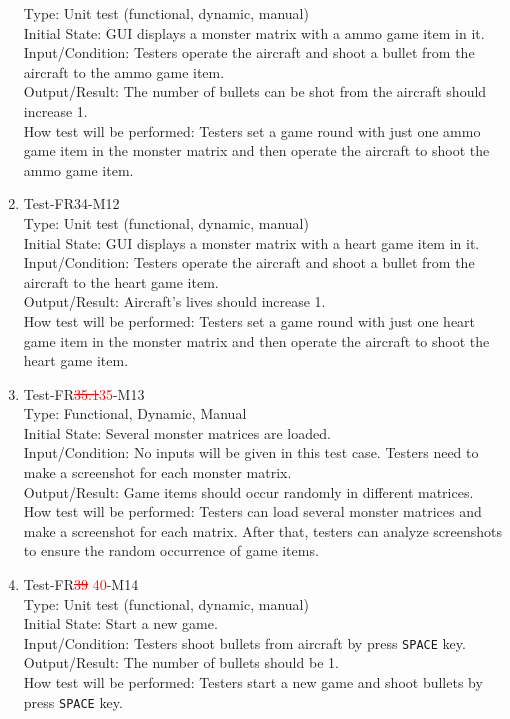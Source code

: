 \documentclass[12pt]{article}
\begin{document}
\begin{enumerate}[1.]
Type: Unit test (functional, dynamic, manual)\\
Initial State: GUI displays a monster matrix with a ammo
game item in it.\\
Input/Condition: Testers operate the aircraft and shoot a bullet
from the aircraft to the ammo game item.\\
Output/Result: The number of bullets can be shot from the 
aircraft should increase 1.\\
How test will be performed: Testers set a game round
with just one ammo game item in the monster matrix and then operate
the aircraft to shoot the ammo game item.
\item Test-FR34-M12\\
Type: Unit test (functional, dynamic, manual)\\
Initial State: GUI displays a monster matrix with a heart
game item in it.\\
Input/Condition:  Testers operate the aircraft and shoot a bullet
from the aircraft to the heart game item.\\
Output/Result: Aircraft's lives should increase 1.\\
How test will be performed:  Testers set a game round
with just one heart game item in the monster matrix and then operate
the aircraft to shoot the heart game item.
\item Test-FR\textcolor{red}{\st{35.1}35}-M13\\
Type: Functional, Dynamic, Manual\\
Initial State: Several monster matrices are loaded.\\ 
Input/Condition: No inputs will be given in this test case. Testers
need to make a screenshot for
each monster matrix.\\
Output/Result: Game items should occur randomly in 
different matrices.\\
How test will be performed: Testers can load several 
monster matrices and make a screenshot for each matrix.
After that, testers can analyze screenshots to ensure
the random occurrence of game items.
\newpage
\item Test-FR\textcolor{red}{\st{39} 40}-M14\\
Type: Unit test (functional, dynamic, manual)\\
Initial State: Start a new game.\\
Input/Condition: Testers shoot bullets from 
aircraft by press \verb|SPACE| key.\\
Output/Result: The number of bullets should be 1.\\
How test will be performed: Testers start a new game
and shoot bullets by press \verb|SPACE| key.
\end{enumerate}
\end{document}
